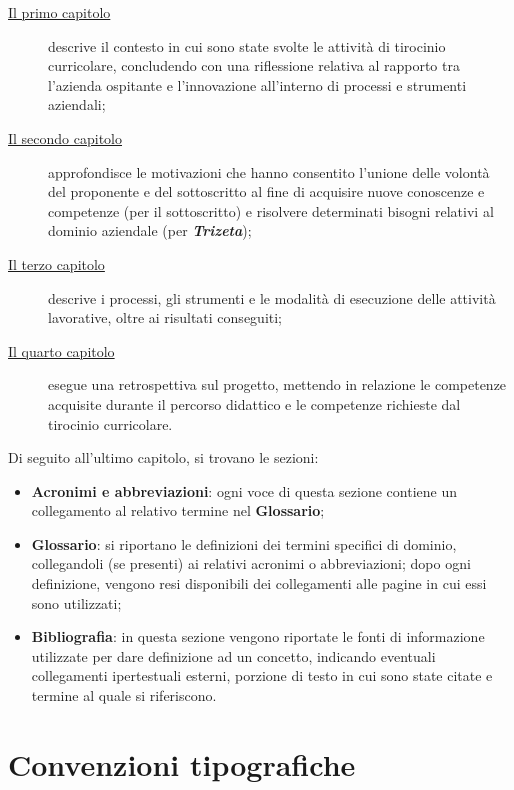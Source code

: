 \begin{description}
    \item[{\hyperref[cap:contesto-svolgimento]{Il primo capitolo}}] descrive il contesto in cui sono state svolte le attività di tirocinio curricolare, concludendo con una riflessione relativa al rapporto tra l'azienda ospitante e l'innovazione all'interno di processi e strumenti aziendali; 
    
    \item[{\hyperref[cap:motivazioni-tirocinio]{Il secondo capitolo}}] approfondisce le motivazioni che hanno consentito l'unione delle volontà del proponente e del sottoscritto al fine di acquisire nuove conoscenze e competenze (per il sottoscritto) e risolvere determinati bisogni relativi al dominio aziendale (per \textbf{\textit{Trizeta}});
    
    \item[{\hyperref[cap:elementi-progetto]{Il terzo capitolo}}] descrive i processi, gli strumenti e le modalità di esecuzione delle attività lavorative, oltre ai risultati conseguiti;
    
    \item[{\hyperref[cap:resoconto]{Il quarto capitolo}}] esegue una retrospettiva sul progetto, mettendo in relazione le competenze acquisite durante il percorso didattico e le competenze richieste dal tirocinio curricolare.
\end{description}

Di seguito all'ultimo capitolo, si trovano le sezioni:
\begin{itemize}
    \item \textbf{Acronimi e abbreviazioni}: ogni voce di questa sezione contiene un collegamento al relativo termine nel \textbf{Glossario};
    \item \textbf{Glossario}: si riportano le definizioni dei termini specifici di dominio, collegandoli (se presenti) ai relativi acronimi o abbreviazioni; dopo ogni definizione, vengono resi disponibili dei collegamenti alle pagine in cui essi sono utilizzati;
    \item \textbf{Bibliografia}: in questa sezione vengono riportate le fonti di informazione utilizzate per dare definizione ad un concetto, indicando eventuali collegamenti ipertestuali esterni, porzione di testo in cui sono state citate e termine al quale si riferiscono.
\end{itemize}

\section*{Convenzioni tipografiche}

